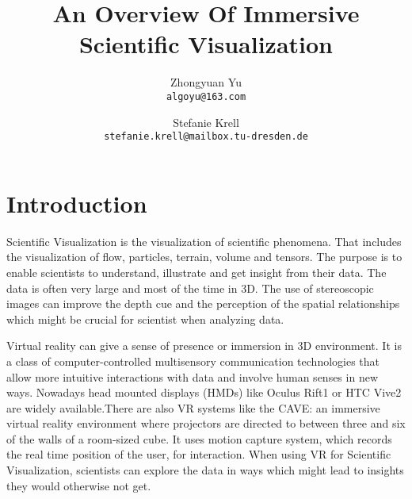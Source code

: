 \documentclass[10pt,twocolumn,letterpaper]{article}
\begin{document}
\title{An Overview Of Immersive Scientific Visualization}

\author{Zhongyuan Yu\\
{\tt\small algoyu@163.com}
\and
Stefanie Krell\\
{\tt\small stefanie.krell@mailbox.tu-dresden.de}
}

\maketitle


\section{Introduction}

Scientific Visualization is the visualization of scientific phenomena. That includes the visualization of flow, particles, terrain, volume and tensors. The purpose is to enable scientists to understand, illustrate and get insight from their data. The data is often very large and most of the time in 3D.  The use of stereoscopic images can improve the depth cue and the perception of the spatial relationships which might be crucial for scientist when analyzing data. 


\setlength{\parindent}{1pc}
Virtual reality can give a sense of presence or immersion in 3D environment. It is a class of computer-controlled multisensory communication technologies that allow more intuitive interactions with data and involve human senses in new ways. Nowadays head mounted displays (HMDs) like Oculus Rift1 or HTC Vive2 are widely available.There are also VR systems like the CAVE: an immersive virtual reality environment where projectors are directed to between three and six of the walls of a room-sized cube. It uses motion capture system, which records the real time position of the user, for interaction. When using VR for Scientific Visualization, scientists can explore the data in ways which might lead to insights they would otherwise not get. 
\end{document}
